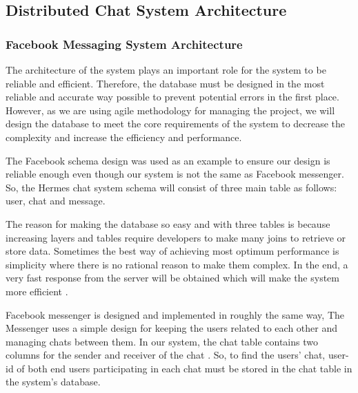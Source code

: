 \documentclass{article}
\begin{document}
\subsection{Distributed Chat System Architecture}
\subsubsection{Facebook Messaging System Architecture}
The architecture of the system plays an important role for the system to be reliable and efficient. Therefore, the database must be designed in the most reliable and accurate way possible to prevent potential errors in the first place. However, as we are using agile methodology for managing the project, we will design the database to meet the core requirements of the system to decrease the complexity and increase the efficiency and performance.\par
The Facebook schema design was used as an example to ensure our design is reliable enough even though our system is not the same as Facebook messenger. So, the Hermes chat system schema will consist of three main table as follows: user, chat and message. \par
The reason for making the database so easy and with three tables is because increasing layers and tables require developers to make many joins to retrieve or store data. Sometimes the best way of achieving most optimum performance is simplicity where there is no rational reason to make them complex. In the end, a very fast response from the server will be obtained which will make the system more efficient \cite{FB-Messenger}. \par
Facebook messenger is designed and implemented in roughly the same way, The Messenger uses a simple design for keeping the users related to each other and managing chats between them. In our system, the chat table contains two columns for the sender and receiver of the chat \cite{CodeDodle}. So, to find the users’ chat, user-id of both end users participating in each chat must be stored in the chat table in the system’s database. 
\end{document}

